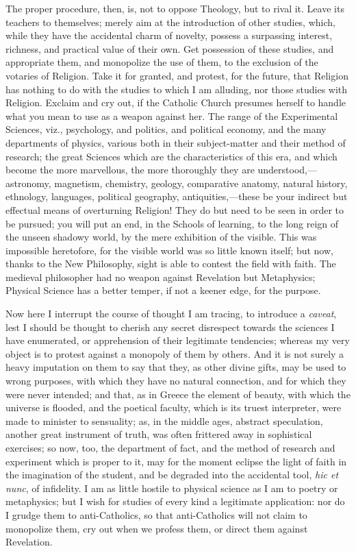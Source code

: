 The proper procedure, then, is, not to oppose Theology, but to
rival it. Leave its teachers to themselves; merely aim at the
introduction of other studies, which, while they have the accidental
charm of novelty, possess a surpassing interest, richness, and
practical value of their own. Get possession of these studies, and
appropriate them, and monopolize the use of them, to the exclusion of
the votaries of Religion. Take it for granted, and protest, for the
future, that Religion has nothing to do with the studies to which I am
alluding, nor those studies with Religion. Exclaim and cry out, if the
Catholic Church presumes herself to handle what you mean to use as a
weapon against her. The range of the Experimental Sciences, viz.,
psychology, and politics, and political economy, and the many
departments of physics, various both in their subject-matter and their
method of research; the great Sciences which are the characteristics
of this era, and which become the more marvellous, the more thoroughly
they are understood,—astronomy, magnetism, chemistry, geology,
comparative anatomy, natural history, ethnology, languages, political
geography, antiquities,—these be your indirect but effectual means
of overturning Religion! They do but need to be seen in order to be
pursued; you will put an end, in the Schools of learning, to the long
reign of the unseen shadowy world, by the mere exhibition of the
visible. This was impossible heretofore, for the visible world was so
little known itself; but now, thanks to the New Philosophy, sight is
able to contest the field with faith. The medieval philosopher had no
weapon against Revelation but Metaphysics; Physical Science has a
better temper, if not a keener edge, for the purpose.

Now here I interrupt the course of thought I am tracing, to
introduce a \emph{caveat}, lest I should be thought to cherish any
secret disrespect towards the sciences I have enumerated, or
apprehension of their legitimate tendencies; whereas my very
object is to protest against a monopoly of them by others. And it is
not surely a heavy imputation on them to say that they, as other
divine gifts, may be used to wrong purposes, with which they have no
natural connection, and for which they were never intended; and that,
as in Greece the element of beauty, with which the universe is
flooded, and the poetical faculty, which is its truest interpreter,
were made to minister to sensuality; as, in the middle ages, abstract
speculation, another great instrument of truth, was often frittered
away in sophistical exercises; so now, too, the department of fact,
and the method of research and experiment which is proper to it, may
for the moment eclipse the light of faith in the imagination of the
student, and be degraded into the accidental tool, \emph{hic et nunc},
of infidelity. I am as little hostile to physical science as I am to
poetry or metaphysics; but I wish for studies of every kind a
legitimate application: nor do I grudge them to anti-Catholics, so
that anti-Catholics will not claim to monopolize them, cry out when we
profess them, or direct them against Revelation.

